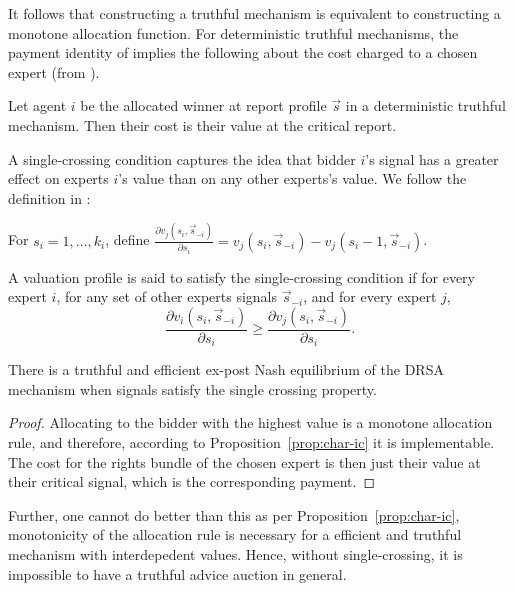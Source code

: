 It follows that constructing a truthful mechanism is equivalent to constructing a monotone allocation function.
For deterministic truthful mechanisms, the payment identity of \citet{roughgarden2016optimal} implies the following about the cost charged to a chosen expert (from \cite{eden2018interdependent}).

\begin{prop}\label{prop:deterministic_payment}
	Let agent $i$ be the allocated winner at report profile $\vec{s}$ in a deterministic truthful mechanism. Then their cost is their value at the critical report.
\end{prop}


A single-crossing condition captures the idea that bidder $i$'s signal has a greater effect on experts $i$'s value than on any other experts's value. We follow the definition in \cite{eden2018interdependent}:

For $s_i = 1, \ldots, k_i$, define $\frac{\partial v_j(s_i, \vec{s}_{-i})}{\partial s_i} = v_j(s_i, \vec{s}_{-i}) - v_j(s_i - 1, \vec{s}_{-i})$.

\begin{defn}
	A valuation profile is said to satisfy the single-crossing condition if for every expert $i$, for any set of other experts  signals $\vec{s}_{-i}$, and for every expert $j$, $$\frac{\partial v_i(s_i, \vec{s}_{-i})}{\partial s_i} \geq \frac{\partial v_j(s_i, \vec{s}_{-i})}{\partial s_i}.$$
\end{defn}



\begin{thm}
	There is a truthful and efficient ex-post Nash equilibrium of the DRSA mechanism when signals satisfy the single crossing property.
\end{thm}

\begin{proof}
Allocating to the bidder with the highest value is a monotone allocation rule, and therefore, according to Proposition~\ref{prop:char-ic} it is implementable. The cost for the rights bundle of the chosen expert is then just their value at their critical signal, which is the corresponding payment.
\end{proof}

Further, one cannot do better than this as per Proposition~\ref{prop:char-ic}, monotonicity of the allocation rule is necessary for a efficient and truthful mechanism with interdepedent values. Hence, without single-crossing, it is impossible to have a truthful advice auction in general.

